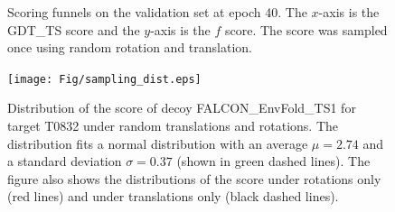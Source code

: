\documentclass[letter,10pt]{article}
\begin{document}
\begin{figure}[H]

    \centering

    \caption{Scoring funnels on the validation set at epoch 40. The
      $x$-axis is the GDT\_TS score and the $y$-axis is the $f$
      score. The score was sampled once using random rotation and
      translation.}
%
    \label{Fig:ValidationEpoch40}
\end{figure}



\begin{figure}[H]
    \centering
    \texttt{[image: Fig/sampling\_dist.eps]}
%
    \caption{Distribution of the score of decoy FALCON\_EnvFold\_TS1
    for target T0832 under random translations and rotations. The
    distribution fits a normal distribution with an average $\mu =
    2.74$ and a standard deviation $\sigma = 0.37$ (shown in green
    dashed lines). The figure also shows the distributions of the
    score under rotations only (red lines) and under translations only
    (black dashed lines).}
%
    \label{Fig:ScoreDistribution}
\end{figure}
\end{document}
